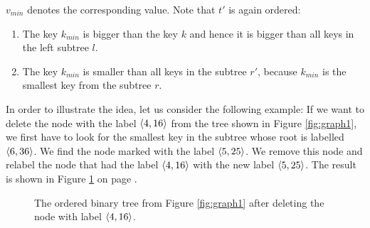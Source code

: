 $v_{min}$ denotes the corresponding value.  Note that $t'$ is again ordered:
\begin{enumerate}
\item The key $k_{min}$ is bigger than the key $k$ and hence it is bigger than all keys in the left
      subtree $l$.
\item The key $k_{min}$ is smaller than all keys in the subtree  $r'$, because $k_{min}$ is the
      smallest key from the subtree $r$.
\end{enumerate}
In order to illustrate the idea, let us consider the following example: 
If we want to delete the node with the label  $\pair(4,16)$ from the tree shown in Figure
\ref{fig:graph1}, we first have to look for the smallest key in the subtree whose root is labelled
$\pair(6,36)$.  We find the node marked with the label $\pair(5,25)$.  We remove this node and
relabel the node that had the label $\pair(4,16)$ with the new label $\pair(5,25)$.  The result is
shown in Figure \ref{fig:graph2} on page \pageref{fig:graph2}.

\begin{figure}[!th]
  \centering
  \caption{The ordered binary tree from Figure  
          \ref{fig:graph1} after deleting the node with label $\pair(4,16)$.}
  \label{fig:graph2}
\end{figure}

